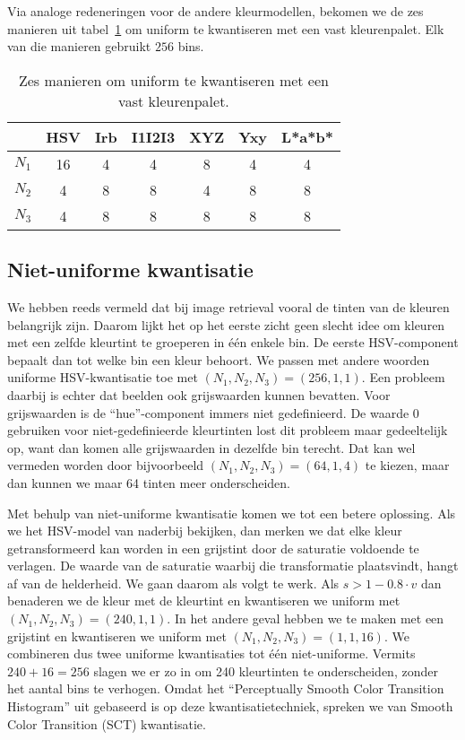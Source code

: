 Via analoge redeneringen voor de andere kleurmodellen, bekomen we de zes manieren 
uit tabel~\ref{tab:uniforme_kwantisatie} om uniform te kwantiseren met een vast kleurenpalet.
Elk van die manieren gebruikt $256$ bins.

\begin{table}[bp]
\vspace{5pt}
\centering
\begin{tabular}{c|cccccc}
 		& HSV & Irb & I1I2I3 & XYZ & Yxy & L*a*b* \\
\hline
$N_1$ 	& 16 & 4 & 4 & 8 & 4 & 4 \\
$N_2$	& 4  & 8 & 8 & 4 & 8 & 8 \\
$N_3$	& 4  & 8 & 8 & 8 & 8 & 8 \\
\end{tabular}
\vspace{5pt}
\caption{\label{tab:uniforme_kwantisatie}Zes manieren om uniform te kwantiseren met een vast 
kleurenpalet.}
\end{table}


\subsection{Niet-uniforme kwantisatie}

We hebben reeds vermeld dat bij image retrieval vooral de tinten van de kleuren belangrijk zijn. Daarom 
lijkt het op het eerste zicht geen slecht idee om kleuren met een zelfde kleurtint te groeperen in 
\'e\'en enkele bin. De eerste HSV-component bepaalt dan tot welke bin een kleur behoort. We passen
met andere woorden uniforme HSV-kwantisatie toe met $(N_1,N_2,N_3)=(256,1,1)$. Een probleem daarbij 
is echter dat beelden ook grijswaarden kunnen bevatten. Voor grijswaarden is de ``hue''-component immers 
niet gedefinieerd. De waarde 0 gebruiken voor niet-gedefinieerde kleurtinten lost dit probleem maar 
gedeeltelijk op, want dan komen alle grijswaarden in dezelfde bin terecht. Dat kan wel vermeden worden 
door bijvoorbeeld $(N_1,N_2,N_3)=(64,1,4)$ te kiezen, maar dan kunnen we maar 64 tinten meer onderscheiden.

Met behulp van niet-uniforme kwantisatie komen we tot een betere oplossing. Als we het HSV-model van naderbij
bekijken, dan merken we dat elke kleur getransformeerd kan worden in een grijstint door de saturatie
voldoende te verlagen. De waarde van de saturatie waarbij die transformatie plaatsvindt, hangt af
van de helderheid. We gaan daarom als volgt te werk. Als $s > 1 - 0.8 \cdot v$ dan benaderen we de kleur
met de kleurtint en kwantiseren we uniform met $(N_1,N_2,N_3)=(240,1,1)$. In het andere geval hebben we
te maken met een grijstint en kwantiseren we uniform met $(N_1,N_2,N_3)=(1,1,16)$. We combineren dus
twee uniforme kwantisaties tot \'e\'en niet-uniforme. Vermits $240 + 16 = 256$
slagen we er zo in om 240 kleurtinten te onderscheiden, zonder het aantal bins te verhogen. Omdat het
``Perceptually Smooth Color Transition Histogram'' uit \cite{sural:perceptually_smooth_histogram} 
gebaseerd is op deze kwantisatietechniek, spreken we van Smooth Color Transition (SCT) kwantisatie.  

